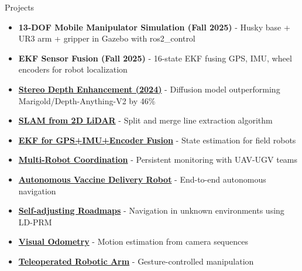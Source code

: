 \documentclass{resume} %
\begin{document}
\vspace{-0.2cm}
\begin{rSection}{Projects}
\vspace{-0.1cm}
    \begin{itemize}[noitemsep]
        \item {\bf 13-DOF Mobile Manipulator Simulation (Fall 2025)} - Husky base + UR3 arm + gripper in Gazebo with ros2\_control

        \item {\bf EKF Sensor Fusion (Fall 2025)} - 16-state EKF fusing GPS, IMU, wheel encoders for robot localization

        \item \href{https://hanlinmai.web.illinois.edu/assets/3D_vision_poster.pdf}{\bf Stereo Depth Enhancement (2024)} - Diffusion model outperforming Marigold/Depth-Anything-V2 by 46\%

        \item {\bf \href{https://github.com/kulbir-ahluwalia/SLAM_using_2D_LiDAR_points}{SLAM from 2D LiDAR}} - Split and merge line extraction algorithm

        \item {\bf \href{https://github.com/kulbir-ahluwalia/Extended_Kalman_Filter_for_GPS_INS_sensor_fusion}{EKF for GPS+IMU+Encoder Fusion}} - State estimation for field robots

        \item {\bf \href{https://github.com/kulbir-ahluwalia/Persistent-Monitoring-using-Multi-Robot-UAV-UGV-Coordination}{Multi-Robot Coordination}} - Persistent monitoring with UAV-UGV teams

        \item {\bf \href{https://github.com/kulbir-ahluwalia/Autonomous_Vaccine_Delivery_Robot}{Autonomous Vaccine Delivery Robot}} - End-to-end autonomous navigation

        \item {\bf \href{https://github.com/kulbir-ahluwalia/self-adjusting-roadmaps}{Self-adjusting Roadmaps}} - Navigation in unknown environments using LD-PRM

        \item {\bf \href{https://github.com/kulbir-ahluwalia/Visual_Odometry_ENPM673_Perception}{Visual Odometry}} - Motion estimation from camera sequences

        \item {\bf \href{https://github.com/kulbir-ahluwalia/Gesture-controlled-mobile-robotic-arm}{Teleoperated Robotic Arm}} - Gesture-controlled manipulation
    \end{itemize}
\end{rSection}
\end{document}
